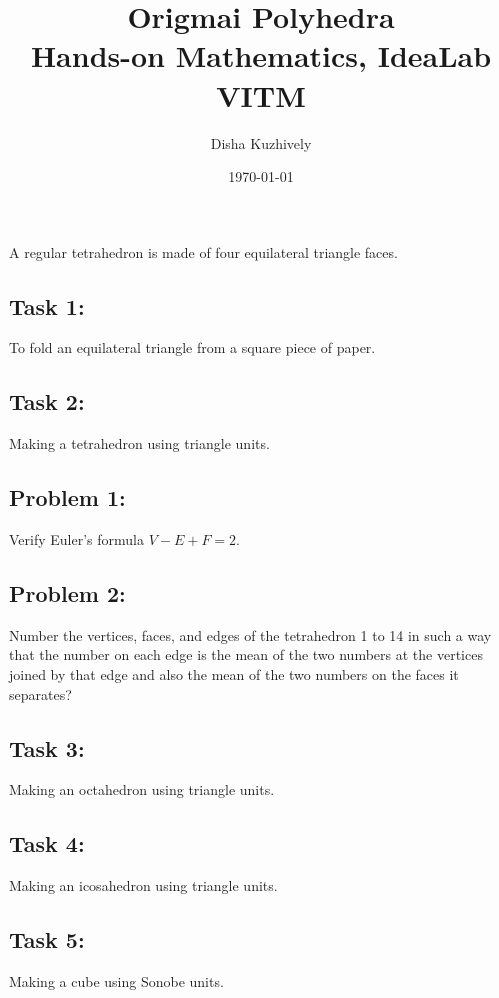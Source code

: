 \documentclass[12pt,a4paper]{../kaNita-kAnakam-2026/program-proposal}
\title{Origmai Polyhedra\\{\normalsize Hands-on Mathematics, IdeaLab VITM}}
\author{Disha Kuzhively}
\date{\today}
\begin{document}
\maketitle
\thispagestyle{empty}
A regular tetrahedron is made of four equilateral triangle faces.

\subsection{Task 1:} To fold an equilateral triangle from a square piece of paper. 
\subsection{Task 2:} Making a tetrahedron using triangle units.
\subsection{Problem 1:} Verify Euler's formula $V- E + F= 2$.
\subsection{Problem 2:} Number the vertices, faces, and edges of the tetrahedron 1 to 14 in such a way that the number on each edge is the mean of the two numbers at the vertices joined by that edge and also the mean of the two numbers on the faces it separates?
\subsection{Task 3:} Making an octahedron using triangle units.
\subsection{Task 4:} Making an icosahedron using triangle units.
\subsection{Task 5:} Making a cube using Sonobe units.
\end{document}
